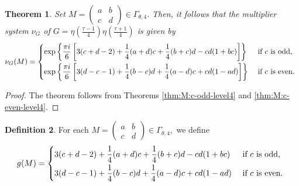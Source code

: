 \documentclass[12pt]{article}
\theoremstyle{definition}
\newtheorem{theorem}{Theorem}
\newtheorem{definition}[theorem]{Definition}
\numberwithin{equation}{section}
\numberwithin{theorem}{section}
\begin{document}
\begin{theorem}
\label{summary-level4}
{\it
Set
$
M=
\begin{pmatrix}
a & b \\
c & d
\end{pmatrix}
\in 
\Gamma_{\theta,4}. 
$ 
Then, it follows that 
the multiplier system 
$\nu_{G}$ of 
 $
\displaystyle 
G=
\eta \left(\frac{\tau-1}{4} \right) \eta\left(\frac{\tau+1}{4} \right) 
$ 
is given by 
\begin{equation*}
\nu_{G}(M)=
\begin{cases}
\exp
\left\{
\displaystyle
\frac{\pi i}{6}
\left[
3(c+d-2)+\frac14(a+d)c+\frac14(b+c)d-cd(1+bc)
\right]
\right\}   
&
\text
{ 
if
$c$ is odd,
} \vspace{1mm}  \\
\exp
\left\{
\displaystyle
\frac{\pi i}{6}
\left[
3(d-c-1)+\frac14(b-c)d+\frac14(a-d)c+cd(1-ad)
\right]
\right\}   
&
\text
{ 
if
$c$ is even. 
}  
\end{cases}
\end{equation*}
}
\end{theorem}


\begin{proof}
The theorem follows from 
Theorems 
\ref{thm:M:c-odd-level4} 
and 
\ref{thm:M:c-even-level4}.
\end{proof}



\begin{definition}
For each 
$
M=
\begin{pmatrix}
a & b \\
c & d
\end{pmatrix}
\in 
\Gamma_{\theta,4},
$ 
we define 
\begin{equation*}
g(M)
=
\begin{cases}
\displaystyle
3(c+d-2)+\frac14(a+d)c+\frac14(b+c)d-cd(1+bc)
&
\text
{ 
if
$c$ is odd,
}  \vspace{1mm} \\
\displaystyle
3(d-c-1)+\frac14(b-c)d+\frac14(a-d)c+cd(1-ad)  
&
\text
{ 
if
$c$ is even. 
}  
\end{cases}
\end{equation*}
\end{definition}
\end{document}
